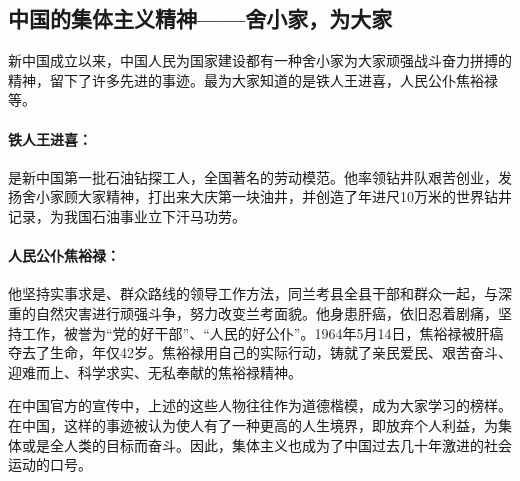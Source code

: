 \subsection{中国的集体主义精神——舍小家，为大家}
\par
新中国成立以来，中国人民为国家建设都有一种舍小家为大家顽强战斗奋力拼搏的精神，留下了许多先进的事迹。最为大家知道的是铁人王进喜，人民公仆焦裕禄等。

\paragraph{铁人王进喜：}
是新中国第一批石油钻探工人，全国著名的劳动模范。他率领钻井队艰苦创业，发扬舍小家顾大家精神，打出来大庆第一块油井，并创造了年进尺10万米的世界钻井记录，为我国石油事业立下汗马功劳。
\paragraph{人民公仆焦裕禄：}
他坚持实事求是、群众路线的领导工作方法，同兰考县全县干部和群众一起，与深重的自然灾害进行顽强斗争，努力改变兰考面貌。他身患肝癌，依旧忍着剧痛，坚持工作，被誉为“党的好干部”、“人民的好公仆”。1964年5月14日，焦裕禄被肝癌夺去了生命，年仅42岁。焦裕禄用自己的实际行动，铸就了亲民爱民、艰苦奋斗、迎难而上、科学求实、无私奉献的焦裕禄精神。
\vspace{1em}
\par
在中国官方的宣传中，上述的这些人物往往作为道德楷模，成为大家学习的榜样。在中国，这样的事迹被认为使人有了一种更高的人生境界，即放弃个人利益，为集体或是全人类的目标而奋斗。因此，集体主义也成为了中国过去几十年激进的社会运动的口号。
